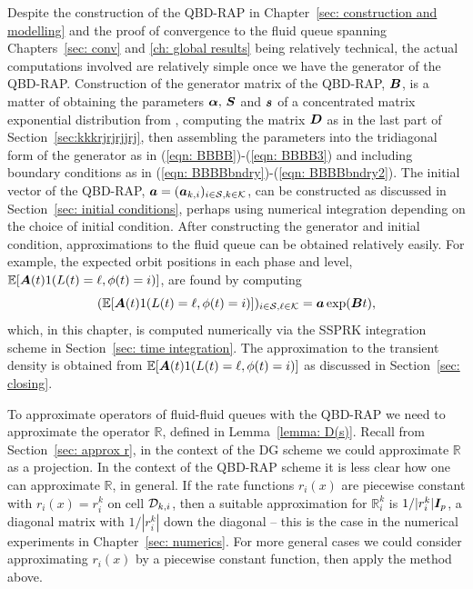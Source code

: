 Despite the construction of the QBD-RAP in Chapter~\ref{sec: construction and modelling} and the proof of convergence to the fluid queue spanning Chapters~\ref{sec: conv} and \ref{ch: global results} being relatively technical, the actual computations involved are relatively simple once we have the generator of the QBD-RAP. Construction of the generator matrix of the QBD-RAP, \(\boldsymbol B\), is a matter of obtaining the parameters \(\boldsymbol\alpha,\,\boldsymbol S\) and \(\boldsymbol s\) of a concentrated matrix exponential distribution from \cite{hht2020}, computing the matrix \(\boldsymbol D\) as in the last part of Section~\ref{sec:kkkrjrjrjjrj}, then assembling the parameters into the tridiagonal form of the generator as in (\ref{eqn: BBBB})-(\ref{eqn: BBBB3}) and including boundary conditions as in (\ref{eqn: BBBBbndry})-(\ref{eqn: BBBBbndry2}). The initial vector of the QBD-RAP, \(\boldsymbol a=(\boldsymbol a_{k,i})_{i\in\mathcal{S},k\in\mathcal K}\), can be constructed as discussed in Section~\ref{sec: initial conditions}, perhaps using numerical integration depending on the choice of initial condition. After constructing the generator and initial condition, approximations to the fluid queue can be obtained relatively easily. For example, the expected orbit positions in each phase and level, \(\mathbb E[\boldsymbol A(t)1(L(t)=\ell, \phi(t)=i)]\), are found by computing 
\[(\mathbb E[\boldsymbol A(t)1(L(t)=\ell, \phi(t)=i)])_{i\in\mathcal{S}, \ell \in\mathcal K}=\boldsymbol a \exp(\boldsymbol Bt),\]
which, in this chapter, is computed numerically via the SSPRK integration scheme in Section~\ref{sec: time integration}. The approximation to the transient density is obtained from \(\mathbb E[\boldsymbol A(t)1(L(t)=\ell, \phi(t)=i)]\) as discussed in Section~\ref{sec: closing}.

To approximate operators of fluid-fluid queues with the QBD-RAP  we need to approximate the operator \(\mathbb R\), defined in Lemma~\ref{lemma: D(s)}. Recall from Section~\ref{sec: approx r}, in the context of the DG scheme we could approximate \(\mathbb R\) as a projection. In the context of the QBD-RAP scheme it is less clear how one can approximate \(\mathbb R\), in general. If the rate functions \(r_i(x)\) are piecewise constant with \(r_i(x)=r_i^k\) on cell \(\mathcal{D}_{k,i}\), then a suitable approximation for \(\mathbb R^k_i\) is \(1/|r_i^k|\boldsymbol I_{p}\), a diagonal matrix with \(1/|r_i^k|\) down the diagonal -- this is the case in the numerical experiments in Chapter~\ref{sec: numerics}. For more general cases we could consider approximating \(r_i(x)\) by a piecewise constant function, then apply the method above.

